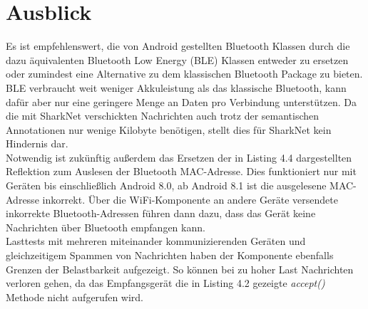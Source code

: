 \section{Ausblick}
Es ist empfehlenswert, die von Android gestellten Bluetooth Klassen durch die dazu äquivalenten Bluetooth Low Energy (BLE) Klassen entweder zu ersetzen oder zumindest eine Alternative zu dem klassischen Bluetooth Package zu bieten. BLE verbraucht weit weniger Akkuleistung als das klassische Bluetooth, kann dafür aber nur eine geringere Menge an Daten pro Verbindung unterstützen. Da die mit SharkNet verschickten Nachrichten auch trotz der semantischen Annotationen nur wenige Kilobyte benötigen, stellt dies für SharkNet kein Hindernis dar.
\\Notwendig ist zukünftig außerdem das Ersetzen der in Listing 4.4 dargestellten Reflektion zum Auslesen der Bluetooth MAC-Adresse. Dies funktioniert nur mit Geräten bis einschließlich Android 8.0, ab Android 8.1 ist die ausgelesene MAC-Adresse inkorrekt. Über die WiFi-Komponente an andere Geräte versendete inkorrekte Bluetooth-Adressen führen dann dazu, dass das Gerät keine Nachrichten über Bluetooth empfangen kann. 
\\Lasttests mit mehreren miteinander kommunizierenden Geräten und gleichzeitigem Spammen von Nachrichten haben der Komponente ebenfalls Grenzen der Belastbarkeit aufgezeigt. So können bei zu hoher Last Nachrichten verloren gehen, da das Empfangsgerät die in Listing 4.2 gezeigte \textit{accept()} Methode nicht aufgerufen wird. 
 

